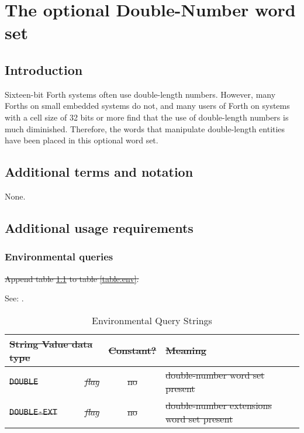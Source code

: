\chapter{The optional Double-Number word set} %

\section{Introduction} %

Sixteen-bit Forth systems often use double-length numbers. However,
many Forths on small embedded systems do not, and many users of Forth
on systems with a cell size of 32 bits or more find that the use of
double-length numbers is much diminished. Therefore, the words that
manipulate double-length entities have been placed in this optional
word set.

\section{Additional terms and notation} %

None.

\section{Additional usage requirements} %

\subsection{Environmental queries} %
\cbstart{}%

\sout{Append table \ref{double:env} to table \ref{table:env}.}

See: .

\begin{table}[ht]
  \begin{center}
	\caption{Environmental Query Strings}
	\label{double:env}
	\begin{tabular}{p{9em}rcp{}}
		\hline\hline
		\multicolumn{2}{l}{\sout{String \hfill Value data type}} & \sout{Constant?} & \sout{Meaning} \\
		\hline
		\sout{\texttt{DOUBLE}}		& \sout{\emph{flag}}	& \sout{no}	&
			\sout{double-number word set present} \\
		\sout{\texttt{DOUBLE-EXT}}	& \sout{\emph{flag}}	& \sout{no}	&
			\sout{double-number extensions word set present} \\
		\hline\hline
	\end{tabular}
  \end{center}
\end{table}
\cbend

